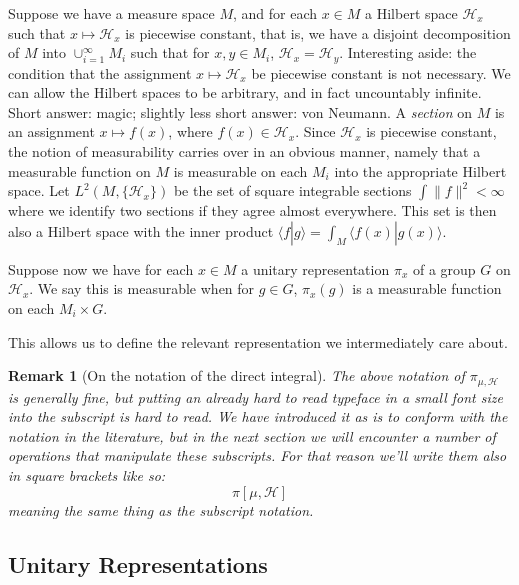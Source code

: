 \documentclass[
  12pt
]{article}
\theoremstyle{break}
\theoremstyle{plain}
\newtheorem*{rk}{Remark}
\newcommand{\hilb}{\ensuremath{\mathscr{H}}}
\begin{document}
  Suppose we have a measure space $M$, and for each $x \in M$ a
  Hilbert space $\mathscr{H}_x$ such that $x \mapsto \mathscr{H}_x$ is
  piecewise constant, that is, we have a disjoint decomposition of $M$
  into $\cup_{i=1}^{\infty} M_i$ such that for $x,y \in M_i$,
  $\mathscr{H}_x = \mathscr{H}_y$. 
  Interesting aside: the condition that the assignment
  $x \mapsto \mathscr{H}_x$ be piecewise constant is not necessary. We
  can allow the Hilbert spaces to be arbitrary, and in fact uncountably
  infinite. Short answer: magic; slightly less short answer: von Neumann.
  A \emph{section} on $M$ is an assignment $x \mapsto f(x)$, where
  $f(x) \in \mathscr{H}_x$. Since $\mathscr{H}_x$ is piecewise
  constant, the notion of measurability carries over in an obvious manner,
  namely that a measurable function on $M$ is measurable on each $M_i$
  into the appropriate Hilbert space. Let $L^2(M, \{\mathscr{H}_x\})$ be
  the set of square integrable sections $\int \| f \|^2 < \infty$ where
  we identify two sections if they agree almost everywhere. This set is
  then also a Hilbert space with the inner product
  $\langle f | g \rangle = \int_M \langle f(x) | g(x) \rangle$.

  Suppose now we have for each $x \in M$ a unitary representation
  $\pi_x$ of a group $G$ on $\mathscr{H}_x$. We say this is
  measurable when for $g \in G$, $\pi_x(g)$ is a measurable function
  on each $M_i \times G$.

  This allows us to define the relevant representation we intermediately
  care about.

  \begin{rk}[On the notation of the direct integral]
    \label{rem:integral-notation}
    The above notation of $\pi_{\mu, \hilb}$ is generally fine, but putting an
    already hard to read typeface in a small font size into the subscript is
    hard to read. We have introduced it as is to conform with the notation in
    the literature, but in the next section we will encounter a number of
    operations that manipulate these subscripts. For that reason we'll write
    them also in square brackets like so:
    $$
    \pi[\mu, \hilb]
    $$
    meaning the same thing as the subscript notation.
  \end{rk}

  \hypertarget{unitary-representations}{%
  \subsection{Unitary Representations}\label{unitary-representations}}
\end{document}
